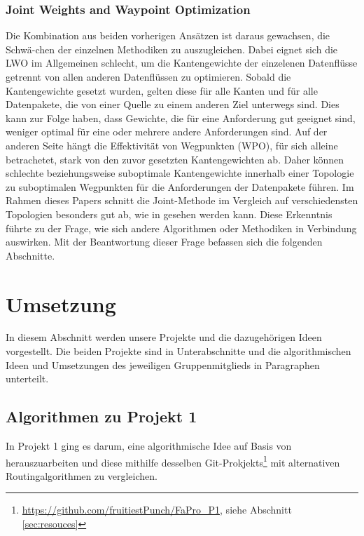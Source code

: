 \documentclass[sigconf, nonacm, review]{acmart}
\begin{document}
\subsubsection{Joint Weights and Waypoint Optimization}
Die Kombination aus beiden vorherigen Ans\"atzen ist daraus gewachsen, 
die Schw\"a-chen der einzelnen Methodiken zu auszugleichen.
Dabei eignet sich die LWO im Allgemeinen schlecht, 
um die Kantengewichte der einzelenen Datenfl\"usse getrennt von allen anderen Datenfl\"ussen zu optimieren.
Sobald die Kantengewichte gesetzt wurden, gelten diese f\"ur alle Kanten und f\"ur alle Datenpakete, 
die von einer Quelle zu einem anderen Ziel unterwegs sind.
Dies kann zur Folge haben, dass Gewichte, die f\"ur eine Anforderung gut geeignet sind, weniger optimal f\"ur eine oder mehrere andere Anforderungen sind.
Auf der anderen Seite h\"angt die Effektivit\"at von Wegpunkten (WPO), 
f\"ur sich alleine betrachetet, stark von den zuvor gesetzten Kantengewichten ab.
Daher k\"onnen schlechte beziehungsweise suboptimale Kantengewichte innerhalb einer Topologie zu suboptimalen Wegpunkten f\"ur die Anforderungen der Datenpakete f\"uhren.
Im Rahmen dieses Papers schnitt die Joint-Methode im Vergleich auf verschiedensten Topologien besonders gut ab, 
wie in \cite{foerster2021} gesehen werden kann.
Diese Erkenntnis f\"uhrte zu der Frage, 
wie sich andere Algorithmen oder Methodiken in Verbindung auswirken. 
Mit der Beantwortung dieser Frage befassen sich die folgenden Abschnitte.
\section{Umsetzung}
In diesem Abschnitt werden unsere Projekte und die dazugeh\"origen Ideen vorgestellt.
Die beiden Projekte sind in Unterabschnitte und die algorithmischen Ideen und Umsetzungen des jeweiligen Gruppenmitglieds in Paragraphen unterteilt. 
\subsection{Algorithmen zu Projekt 1}
In Projekt 1 ging es darum, eine algorithmische Idee auf Basis von \cite{foerster2021} herauszuarbeiten und diese mithilfe desselben Git-Prokjekts\footnote{\url{https://github.com/fruitiestPunch/FaPro_P1}, siehe Abschnitt \ref{sec:resouces}} mit alternativen Routingalgorithmen zu vergleichen. 
\end{document}
